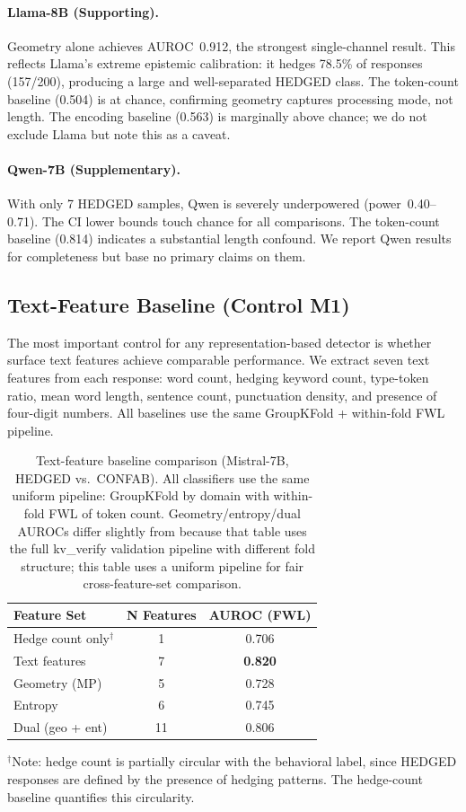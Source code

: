 \documentclass[11pt,a4paper]{article}
\begin{document}
\paragraph{Llama-8B (Supporting).} Geometry alone achieves AUROC~0.912, the strongest single-channel result. This reflects Llama's extreme epistemic calibration: it hedges 78.5\% of responses (157/200), producing a large and well-separated HEDGED class. The token-count baseline (0.504) is at chance, confirming geometry captures processing mode, not length. The encoding baseline (0.563) is marginally above chance; we do not exclude Llama but note this as a caveat.

\paragraph{Qwen-7B (Supplementary).} With only 7 HEDGED samples, Qwen is severely underpowered (power~0.40--0.71). The CI lower bounds touch chance for all comparisons. The token-count baseline (0.814) indicates a substantial length confound. We report Qwen results for completeness but base no primary claims on them.

\subsection{Text-Feature Baseline (Control M1)}
\label{sec:textbaseline}

The most important control for any representation-based detector is whether surface text features achieve comparable performance. We extract seven text features from each response: word count, hedging keyword count, type-token ratio, mean word length, sentence count, punctuation density, and presence of four-digit numbers. All baselines use the same GroupKFold + within-fold FWL pipeline.

\begin{table}[H]
\centering
\caption{Text-feature baseline comparison (Mistral-7B, HEDGED vs.\ CONFAB). All classifiers use the same uniform pipeline: GroupKFold by domain with within-fold FWL of token count. Geometry/entropy/dual AUROCs differ slightly from  because that table uses the full kv\_verify validation pipeline with different fold structure; this table uses a uniform pipeline for fair cross-feature-set comparison.}
\label{tab:textbaseline}
\begin{tabular}{lcc}
\toprule
\textbf{Feature Set} & \textbf{N Features} & \textbf{AUROC (FWL)} \\
\midrule
Hedge count only$^\dagger$ & 1 & 0.706 \\
Text features & 7 & \textbf{0.820} \\
\midrule
Geometry (MP) & 5 & 0.728 \\
Entropy & 6 & 0.745 \\
Dual (geo + ent) & 11 & 0.806 \\
\bottomrule
\end{tabular}

\smallskip
\footnotesize{$^\dagger$Note: hedge count is partially circular with the behavioral label, since HEDGED responses are defined by the presence of hedging patterns. The hedge-count baseline quantifies this circularity.}
\end{table}
\end{document}
